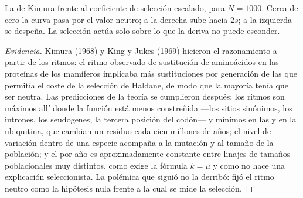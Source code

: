 \begin{omfigure}

{\small La  de Kimura frente al coeficiente de
selección escalado, para $N = 1000$. Cerca de cero la curva pasa por el
valor neutro; a la derecha sube hacia $2s$; a la izquierda se despeña.
La selección actúa solo sobre lo que la deriva no puede esconder.}
\end{omfigure}

\begin{proof}[Evidencia]
Kimura (1968) y King y Jukes (1969) hicieron el razonamiento a partir
de los ritmos: el ritmo observado de sustitución de aminoácidos en las
proteínas de los mamíferos implicaba más sustituciones por generación
de las que permitía el coste de la selección de Haldane, de modo que la
mayoría tenía que ser neutra. Las predicciones de la teoría se
cumplieron después: los ritmos son máximos allí donde la función está
menos constreñida ---los sitios sinónimos, los intrones, los
seudogenes, la tercera posición del codón--- y mínimos en las 
y en la ubiquitina, que cambian un residuo cada cien millones de años;
el nivel de variación dentro de una especie acompaña a la mutación y al
tamaño de la población; y el  por año es
aproximadamente constante entre linajes de tamaños poblacionales muy
distintos, como exige la fórmula $k = \mu$ y como no hace una
explicación seleccionista. La polémica que siguió no la derribó: fijó
el ritmo neutro como la hipótesis nula frente a la cual se mide la
selección.
\end{proof}

